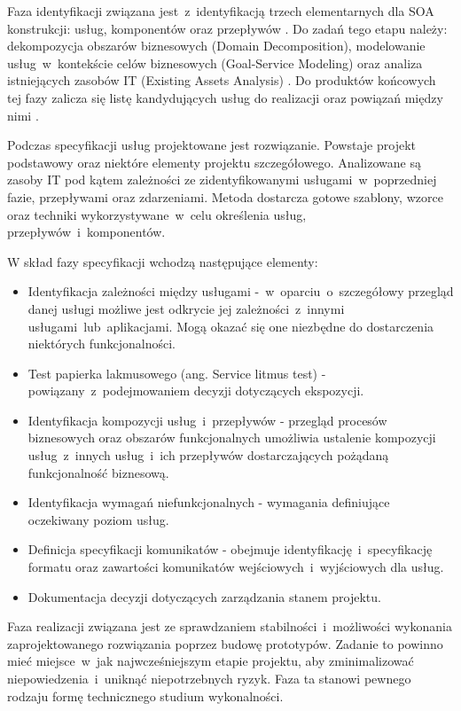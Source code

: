 Faza identyfikacji związana jest~z~identyfikacją trzech elementarnych dla SOA konstrukcji: usług, komponentów oraz przepływów \cite{PlatIntGor}. Do zadań tego etapu należy: dekompozycja obszarów biznesowych (Domain Decomposition), modelowanie usług~w~kontekście celów biznesowych (Goal-Service Modeling) oraz analiza istniejących zasobów IT (Existing Assets Analysis) \cite{SOMAibmRosSuda}. Do produktów końcowych tej fazy zalicza się listę kandydujących usług do realizacji oraz powiązań między nimi \cite{PlatIntGor}.

Podczas specyfikacji usług projektowane jest rozwiązanie. Powstaje projekt podstawowy oraz niektóre elementy projektu szczegółowego. Analizowane są zasoby IT pod kątem zależności ze zidentyfikowanymi usługami~w~poprzedniej fazie, przepływami oraz zdarzeniami. Metoda dostarcza gotowe szablony, wzorce oraz techniki wykorzystywane~w~celu określenia usług, przepływów~i~komponentów. 

W skład fazy specyfikacji wchodzą następujące elementy:
\begin{itemize}
\item{Identyfikacja zależności między usługami -~w~oparciu~o~szczegółowy przegląd danej usługi możliwe jest odkrycie jej zależności~z~innymi usługami~lub~aplikacjami. Mogą okazać się one niezbędne do dostarczenia niektórych funkcjonalności.}
\item{Test papierka lakmusowego (ang. Service litmus test) - powiązany~z~podejmowaniem decyzji dotyczących ekspozycji.}
\item{Identyfikacja kompozycji usług~i~przepływów - przegląd procesów biznesowych oraz obszarów funkcjonalnych umożliwia ustalenie kompozycji usług~z~innych usług~i~ich przepływów dostarczających pożądaną funkcjonalność biznesową.}
\item{Identyfikacja wymagań niefunkcjonalnych - wymagania definiujące oczekiwany poziom usług.}
\item{Definicja specyfikacji komunikatów - obejmuje identyfikację~i~specyfikację formatu oraz zawartości komunikatów wejściowych~i~wyjściowych dla usług.}
\item{Dokumentacja decyzji dotyczących zarządzania stanem projektu.}
\end{itemize}

Faza realizacji związana jest ze sprawdzaniem stabilności~i~możliwości wykonania zaprojektowanego rozwiązania poprzez budowę prototypów. Zadanie to powinno mieć miejsce~w~jak najwcześniejszym etapie projektu, aby zminimalizować niepowiedzenia~i~uniknąć niepotrzebnych ryzyk. Faza ta stanowi pewnego rodzaju formę technicznego studium wykonalności. 

